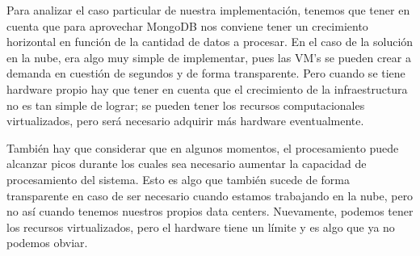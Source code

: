 \documentclass[a4paper,10pt,twoside]{article}
\begin{document}
Para analizar el caso particular de nuestra implementación, tenemos que tener en cuenta que para aprovechar MongoDB nos conviene tener un crecimiento horizontal en función de la cantidad de datos a procesar. En el caso de la solución en la nube, era algo muy simple de implementar, pues las VM's se pueden crear a demanda en cuestión de segundos y de forma transparente. Pero cuando se tiene hardware propio hay que tener en cuenta que el crecimiento de la infraestructura no es tan simple de lograr; se pueden tener los recursos computacionales virtualizados, pero será necesario adquirir más hardware eventualmente.

También hay que considerar que en algunos momentos, el procesamiento puede alcanzar picos durante los cuales sea necesario aumentar la capacidad de procesamiento del sistema. Esto es algo que también sucede de forma transparente en caso de ser necesario cuando estamos trabajando en la nube, pero no así cuando tenemos nuestros propios data centers. Nuevamente, podemos tener los recursos virtualizados, pero el hardware tiene un límite y es algo que ya no podemos obviar.
\end{document}
